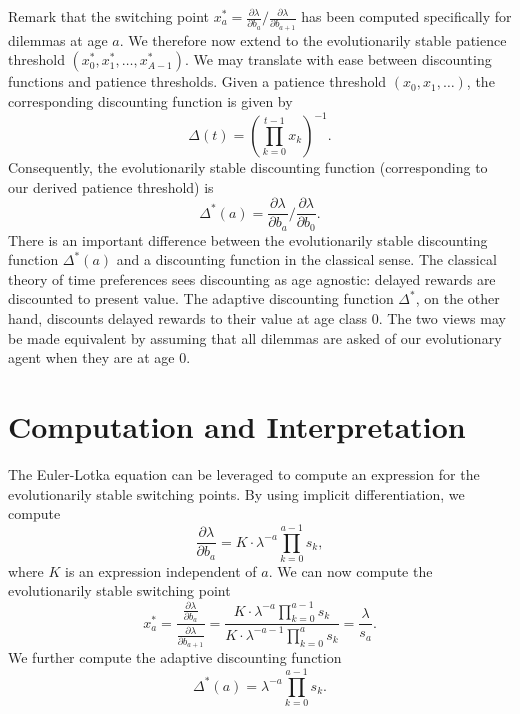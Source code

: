 \documentclass[titlepage, hidelinks, 12pt]{article}
\theoremstyle{plain}
\theoremstyle{remark}
\theoremstyle{definition}
\newcommand{\varSS}{\frac{\partial \lambda}{ \partial b_{a}}}
\newcommand{\varLL}{\frac{\partial \lambda}{ \partial b_{a+1}}}
\begin{document}
Remark that the switching point $x_a^* =  \varSS/\varLL$ has been computed specifically for dilemmas at age $a$. We therefore now extend to
the evolutionarily stable patience threshold $(x_0^*, x_1^*, \ldots, x_{A-1}^*)$. 
We may translate with ease between discounting functions and patience thresholds. Given a patience threshold $(x_0, x_1, \ldots)$, the corresponding
discounting function is given by 
\begin{equation}
    \Delta(t) = \left( \prod\limits_{k = 0}^{t - 1} x_k \right)^{-1}.
\end{equation}
Consequently, the evolutionarily stable discounting function (corresponding to our derived patience threshold) is
\begin{equation}
    \Delta^*(a) = \varSS/\frac{\partial \lambda}{\partial b_0}. 
    \label{eqn:stable_discounting}
\end{equation}
There is an important difference between the evolutionarily stable discounting function $\Delta^*(a)$ and a discounting function in the classical sense. 
The classical theory of time preferences sees discounting as age agnostic: delayed rewards are discounted to present value. The adaptive discounting
function $\Delta^*$, on the other hand, discounts delayed rewards to their value at age class $0$. The two views may be made equivalent by assuming
that all dilemmas are asked of our evolutionary agent when they are at age $0$. 




\section{Computation and Interpretation}
The Euler-Lotka equation can be leveraged to compute an expression for the evolutionarily stable switching points. By using
implicit differentiation, we compute
\begin{equation}
    \frac{\partial \lambda}{\partial b_a} = K\cdot \lambda^{-a} \prod\limits_{k = 0}^{a-1}s_k,
\end{equation}
where $K$ is an expression independent of $a$. We can now compute the evolutionarily stable switching point 
\begin{equation}
    x_a^* = \frac{\varSS}{\varLL} = \frac{K\cdot \lambda^{-a} \prod\limits_{k = 0}^{a-1}s_k}{K\cdot \lambda^{-a-1} \prod\limits_{k = 0}^{a}s_k} = \frac{\lambda}{s_a}.
\end{equation}
We further compute the adaptive discounting function
\begin{equation}
    \Delta^*(a) = \lambda^{-a}\prod\limits_{k = 0}^{a-1} s_k.
\end{equation}
\end{document}
